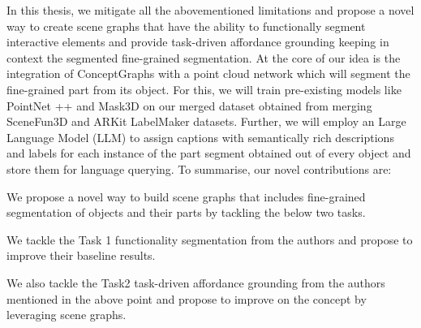  In this thesis, we mitigate all the abovementioned limitations and propose
a novel way to create scene graphs that have the ability to functionally segment
interactive elements and provide task-driven affordance grounding keeping in context the 
segmented fine-grained segmentation. At the core of our idea is the integration of ConceptGraphs with
a point cloud network which will segment the fine-grained part from its object. For this, we will train pre-existing 
models like PointNet ++ and Mask3D on our merged dataset obtained from merging SceneFun3D and ARKit LabelMaker datasets. 
Further, we will employ an Large Language Model (LLM) to assign captions with semantically rich descriptions and 
labels for each instance of the part segment obtained out of every object and store them for language querying. 
To summarise, our novel contributions are:
\begin{compactenum}[1.]
\item We propose a novel way to build scene graphs that includes fine-grained segmentation of objects and their parts by tackling the below two tasks.
\item We tackle the Task 1 functionality segmentation from the authors \citet{delitzas2024scenefun3d} and propose to improve their 
baseline results.
\item We also tackle the Task2 task-driven affordance grounding from the authors mentioned in the above point 
and propose to improve on the concept by leveraging scene graphs.
\end{compactenum}


